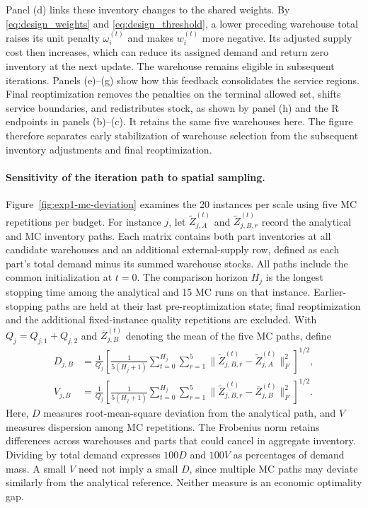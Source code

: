 \documentclass[a4paper,fleqn]{cas-sc}
\theoremstyle{remark}
\theoremstyle{plain}
\begin{document}
Panel (d) links these inventory changes to the shared weights. By \eqref{eq:design_weights} and \eqref{eq:design_threshold}, a lower preceding warehouse total raises its unit penalty $\omega_i^{(t)}$ and makes $w_i^{(t)}$ more negative. Its adjusted supply cost then increases, which can reduce its assigned demand and return zero inventory at the next update. The warehouse remains eligible in subsequent iterations. Panels (e)--(g) show how this feedback consolidates the service regions. Final reoptimization removes the penalties on the terminal allowed set, shifts service boundaries, and redistributes stock, as shown by panel (h) and the R endpoints in panels (b)--(c). It retains the same five warehouses here. The figure therefore separates early stabilization of warehouse selection from the subsequent inventory adjustments and final reoptimization.

\paragraph{Sensitivity of the iteration path to spatial sampling.}
Figure~\ref{fig:exp1-mc-deviation} examines the 20 instances per scale using five MC repetitions per budget. For instance $j$, let $\widetilde Z_{j,A}^{(t)}$ and $\widetilde Z_{j,B,r}^{(t)}$ record the analytical and MC inventory paths. Each matrix contains both part inventories at all candidate warehouses and an additional external-supply row, defined as each part's total demand minus its summed warehouse stocks. All paths include the common initialization at $t=0$. The comparison horizon $H_j$ is the longest stopping time among the analytical and 15 MC runs on that instance. Earlier-stopping paths are held at their last pre-reoptimization state; final reoptimization and the additional fixed-instance quality repetitions are excluded. With $Q_j=Q_{j,1}+Q_{j,2}$ and $\overline Z_{j,B}^{(t)}$ denoting the mean of the five MC paths, define
\begin{subequations}\label{eq:experiment_trajectory_metrics}
\begin{align}
 D_{j,B}&=\frac{1}{Q_j}\left[\frac{1}{5(H_j+1)}\sum_{t=0}^{H_j}\sum_{r=1}^{5}\bigl\|\widetilde Z_{j,B,r}^{(t)}-\widetilde Z_{j,A}^{(t)}\bigr\|_F^2\right]^{1/2},\label{eq:experiment_trajectory_deviation}\\
 V_{j,B}&=\frac{1}{Q_j}\left[\frac{1}{5(H_j+1)}\sum_{t=0}^{H_j}\sum_{r=1}^{5}\bigl\|\widetilde Z_{j,B,r}^{(t)}-\overline Z_{j,B}^{(t)}\bigr\|_F^2\right]^{1/2}.\label{eq:experiment_repeat_dispersion}
\end{align}
\end{subequations}
Here, $D$ measures root-mean-square deviation from the analytical path, and $V$ measures dispersion among MC repetitions. The Frobenius norm retains differences across warehouses and parts that could cancel in aggregate inventory. Dividing by total demand expresses $100D$ and $100V$ as percentages of demand mass. A small $V$ need not imply a small $D$, since multiple MC paths may deviate similarly from the analytical reference. Neither measure is an economic optimality gap.
\end{document}
